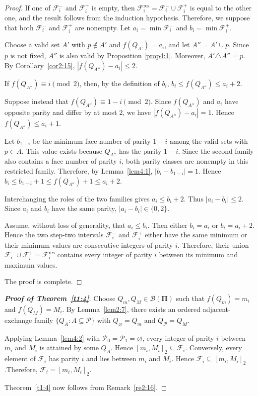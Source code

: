 \documentclass[12pt]{article}
\theoremstyle{definition}
\newcommand{\intervaltwo}[2]{[#1,#2]_2}
\begin{document}
\begin{proof}
If one of $\mathcal F_i^-$ and $\mathcal F_i^+$ is empty, then $\mathcal F_i^{\mathrm{res}}=\mathcal F_i^-\cup\mathcal F_i^+$ is equal to the other one, and the result follows from the induction hypothesis. Therefore, we suppose that both $\mathcal F_i^-$ and $\mathcal F_i^+$ are nonempty. Let $a_i=\min\mathcal F_i^-$ and $b_i=\min\mathcal F_i^+$.

Choose a valid set $A'$ with $p\notin A'$ and
$f(Q_{A'})=a_i$, and let $A''=A'\cup{p}$. Since $p$ is not
fixed, $A''$ is also valid by Proposition \ref{prop4:1}. Moreover,
$A'\triangle A''={p}$. By
Corollary~\ref{cor2:15},
$|f(Q_{A''})-a_i|\leq2$.

If $f(Q_{A''})\equiv i\pmod{2}$, then, by the definition of $b_i$,
$b_i\leq f(Q_{A''})\leq a_i+2$.

Suppose instead that
$f(Q_{A''})\equiv1-i\pmod{2}$. Since $f(Q_{A''})$ and $a_i$ have
opposite parity and differ by at most $2$, we have
$|f(Q_{A''})-a_i|=1$. Hence
$f(Q_{A''})\leq a_i+1$.

Let $b_{1-i}$ be the minimum face number of parity $1-i$ among the
valid sets with $p\in A$. This value exists because $Q_{A''}$ has
the parity $1-i$. Since the second family also contains a face number of
parity $i$, both parity classes are nonempty in this restricted
family. Therefore, by Lemma~\ref{lem4:1},
$|b_i-b_{1-i}|=1$. Hence
$b_i\leq b_{1-i}+1\leq f(Q_{A''})+1\leq a_i+2$.

Interchanging the roles of the two families gives
$a_i\leq b_i+2$. Thus
$|a_i-b_i|\leq2$. Since $a_i$ and $b_i$ have the same parity,
$|a_i-b_i|\in\{0,2\}$.

 Assume, without loss of generality, that $a_i\leq b_i$. Then either
$b_i=a_i$ or $b_i=a_i+2$. Hence the two step-two intervals
$\mathcal F_i^-$ and $\mathcal F_i^+$ either have the same minimum or
their minimum values are consecutive integers of parity $i$. Therefore,
their union
$\mathcal F_i^-\cup\mathcal F_i^+=\mathcal F_i^{\mathrm{res}}$
contains every integer of parity $i$ between its minimum and maximum
values.

The proof is complete.
\end{proof}


\begin{proof}[\bf{Proof of Theorem~\ref{t1:4}}]
Choose $Q_m,Q_M\in\mathcal B(\mathbf{\Pi})$ such that
$f(Q_m)=m_i$ and $f(Q_M)=M_i$. By Lemma~\ref{lem2:7}, there exists
an ordered adjacent-exchange family
$\{Q_A:A\subseteq\mathcal P\}$ with
$Q_\varnothing=Q_m$ and $Q_{\mathcal P}=Q_M$.

Applying Lemma~\ref{lem4:2} with
$\mathcal P_0=\mathcal P_1=\varnothing$, every integer of parity $i$
between $m_i$ and $M_i$ is attained by some $Q_A$. Hence
$\intervaltwo{m_i}{M_i}\subseteq\mathcal F_i$.  Conversely, every element of \(\mathcal F_i\) has parity \(i\) and lies between \(m_i\) and \(M_i\). Hence \(\mathcal F_i\subseteq\intervaltwo{m_i}{M_i}\).Therefore,
$\mathcal F_i=\intervaltwo{m_i}{M_i}$.

Theorem~\ref{t1:4} now follows from Remark~\ref{re2:16}.
\end{proof}
\end{document}

